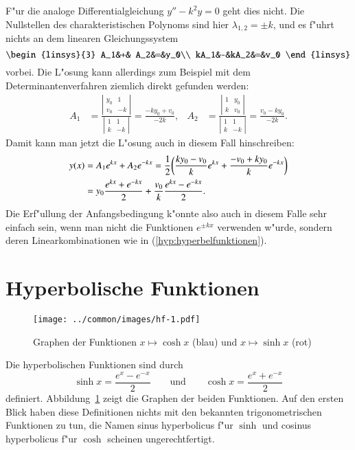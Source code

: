 F"ur die analoge Differentialgleichung $y''-k^2y=0$ geht dies nicht.
Die Nullstellen des charakteristischen Polynoms sind hier 
$\lambda_{1,2}=\pm k$, und es f"uhrt nichts an dem linearen Gleichungssystem
\[
\begin{linsys}{3}
 A_1&+& A_2&=&y_0\\
kA_1&-&kA_2&=&v_0
\end{linsys}
\]
vorbei.
Die L"osung kann allerdings zum Beispiel mit dem Determinantenverfahren
ziemlich direkt gefunden werden:
\begin{align*}
A_1
&=
\frac{\left|\begin{matrix}y_0&1\\v_0&-k\end{matrix}\right|}{\left|\begin{matrix}1&1\\k&-k\end{matrix}\right|}
=
\frac{-ky_0+v_0}{-2k},
&
A_2
&=
\frac{\left|\begin{matrix}1&y_0\\k&v_0\end{matrix}\right|}{\left|\begin{matrix}1&1\\k&-k\end{matrix}\right|}
=\frac{v_0-ky_0}{-2k}.
\end{align*}
Damit kann man jetzt die L"osung auch in diesem Fall hinschreiben:
\begin{align}
y(x)
&=
A_1e^{kx}+A_2e^{-kx}
=
\frac12\biggl(
\frac{ky_0-v_0}k e^{kx}
+
\frac{-v_0+ky_0}k e^{-kx}
\biggr)
\notag
\\
&=
y_0\frac{e^{kx}+e^{-kx}}2
+\frac{v_0}{k}\frac{e^{kx}-e^{-kx}}2.
\label{hyp:hyperbelfunktionen}
\end{align}
Die Erf"ullung der Anfangsbedingung k"onnte also auch in diesem Falle
sehr einfach sein, wenn man nicht die Funktionen $e^{\pm kx}$ verwenden
w"urde, sondern deren Linearkombinationen wie in (\ref{hyp:hyperbelfunktionen}).

\section{Hyperbolische Funktionen}
\begin{figure}
\centering
\texttt{[image: ../common/images/hf-1.pdf]}
\caption{Graphen der Funktionen $x\mapsto\cosh x$ (blau)
und $x\mapsto\sinh x$ (rot)
\label{hyp:graphen}}
\end{figure}
Die hyperbolischen Funktionen sind durch
\[
\sinh x =\frac{e^x-e^{-x}}2
\qquad\text{und}\qquad
\cosh x = \frac{e^x+e^{-x}}2
\]
definiert.
Abbildung~\ref{hyp:graphen} zeigt die Graphen der beiden Funktionen.
Auf den ersten Blick haben diese Definitionen nichts mit den bekannten
trigonometrischen Funktionen zu tun, die Namen sinus hyperbolicus f"ur
$\sinh$ und cosinus hyperbolicus f"ur $\cosh$ scheinen ungerechtfertigt.

